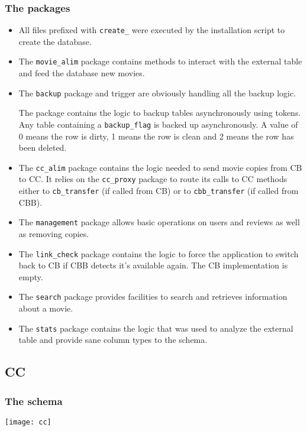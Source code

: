 \documentclass[a4paper]{article}
\begin{document}
\subsubsection{The packages}

\begin{itemize}
	\item All files prefixed with \texttt{create\_} were executed by the installation script to create the database.
	\item The \texttt{movie\_alim} package contains methods to interact with the external table and feed the database new movies.
	\item The \texttt{backup} package and trigger are obviously handling all the backup logic.

	The package contains the logic to backup tables asynchronously using tokens. Any table containing a \texttt{backup\_flag} is backed up asynchronously. A value of 0 means the row is dirty, 1 means the row is clean and 2 means the row has been deleted.
	\item The \texttt{cc\_alim} package contains the logic needed to send movie copies from CB to CC. It relies on the \texttt{cc\_proxy} package to route its calls to CC methods either to \texttt{cb\_transfer} (if called from CB) or to \texttt{cbb\_transfer} (if called from CBB).
	\item The \texttt{management} package allows basic operations on users and reviews as well as removing copies.
	\item The \texttt{link\_check} package contains the logic to force the application to switch back to CB if CBB detects it's available again. The CB implementation is empty.
	\item The \texttt{search} package provides facilities to search and retrieves information about a movie.
	\item The \texttt{stats} package contains the logic that was used to analyze the external table and provide sane column types to the schema.
\end{itemize}

\subsection{CC}

\subsubsection{The schema}

\texttt{[image: cc]}
\end{document}
